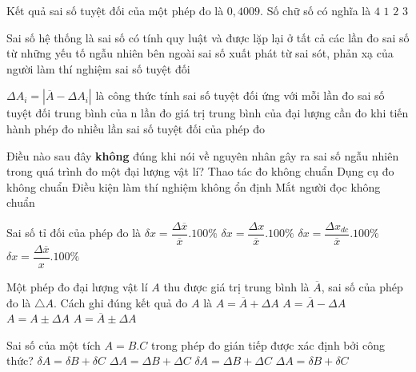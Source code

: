 \begin{ex}%
Kết quả sai số tuyệt đối của một phép đo là $0,4009$. Số chữ số có nghĩa là
\choice
{\True $4$}
{$1$}
{$2$}
{$3$}
\end{ex}
\begin{ex}%
Sai số hệ thống là
\choice
{\True sai số có tính quy luật và được lặp lại ở tất cả các lần đo}
{sai số từ những yếu tố ngẫu nhiên bên ngoài}
{sai số xuất phát từ sai sót, phản xạ của người làm thí nghiệm}
{sai số tuyệt đối}	
\loigiai{
}
\end{ex}
\begin{ex}%
$\Delta A_{i}=\left|\overline{A}-\Delta A_{i}\right|$ là công thức tính
\choice
{\True sai số tuyệt đối ứng với mỗi lần đo}
{sai số tuyệt đối trung bình của n lần đo}
{giá trị trung bình của đại lượng cần đo khi tiến hành phép đo nhiều lần}
{sai số tuyệt đối của phép đo}	
\loigiai{
}
\end{ex}
\begin{ex}%
Điều nào sau đây \textbf{không} đúng khi nói về nguyên nhân gây ra sai số ngẫu nhiên trong quá trình đo một đại lượng vật lí?
\choice
{Thao tác đo không chuẩn}
{\True Dụng cụ đo không chuẩn}
{Điều kiện làm thí nghiệm không ổn định}
{Mắt người đọc không chuẩn}
\loigiai{
}
\end{ex}
\begin{ex}%
Sai số tỉ đối của phép đo là
\choice
{$\delta x=\dfrac{\Delta \overline{x}}{\overline{x}} .  100\%$}
{\True $\delta x=\dfrac{\Delta x}{\overline{x}} .  100\%$}
{$\delta x=\dfrac{\Delta x_{d c}}{\overline{x}} .  100\%$}
{$\delta x=\dfrac{\Delta \overline{x}}{x} .  100\%$}

\loigiai{
}
\end{ex}
\begin{ex}%
Một phép đo đại lượng vật lí $A$ thu được giá trị trung bình là $\overline{A}$, sai số của phép đo là $\triangle A$. Cách ghi đúng kết quả đo $A$ là
\choice
{$A=\overline{A}+\Delta A$}
{$A=\overline{A}-\Delta A$}
{$A=A \pm \Delta A$}
{\True $A=\overline{A} \pm \Delta A$}

\loigiai{}

\end{ex}
\begin{ex}%
Sai số của một tích $A= B. C$ trong phép đo gián tiếp được xác định bởi công thức?
\choice
{\True $\delta A=\delta B+\delta C$}
{$\Delta A=\Delta B+\Delta C$}
{$\delta A=\Delta B+\Delta C$}
{$\Delta A=\delta B+\delta C$}

\loigiai{
}
\end{ex}
